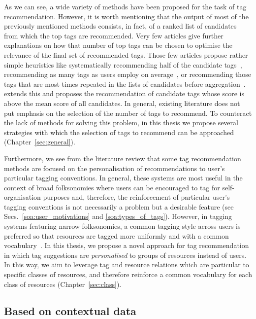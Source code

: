 As we can see, a wide variety of methods have been proposed for the task of tag recommendation.
However, it is worth mentioning that the output of most of the previously mentioned methods consists, in fact, of a ranked list of candidates from which the top tags are recommended. Very few articles give further explanations on how that number of top tags can be chosen to optimise the relevance of the final set of recommended tags. Those few articles propose rather simple heuristics like systematically recommending half of the candidate tags~\citep{Cao2009}, recommending as many tags as users employ on average~\citep{Marinho2009,Rendle2009}, or recommending those tags that are most times repeated in the lists of candidates before aggregation~\citep{martinez2009,moha2012}. \cite{Sood2007} extends this and proposes the recommendation of candidate tags whose score is above the mean score of all candidates. 
In general, existing literature does not put emphasis on the selection of the number of tags to recommend. 
To counteract the lack of methods for solving this problem, in this thesis we propose several strategies with which the selection of tags to recommend can be approached (Chapter~\ref{sec:general}). 

Furthermore, we see from the literature review that some tag recommendation methods are focused on the personalisation of recommendations to user's particular tagging conventions. 
In general, these systems are most useful in the context of broad folksonomies where users can be encouraged to tag for self-organisation purposes and, therefore, the reinforcement of particular user's tagging conventions is not necessarily a problem  but a desirable feature (see Secs.~\ref{soa:user_motivations} and \ref{soa:types_of_tags}).
However, in tagging systems featuring narrow folksonomies, a common tagging style across users is preferred so that resources are tagged more uniformly and with a common vocabulary~\citep{Lipczak2008}. In this thesis, we propose a novel approach for tag recommendation in which tag suggestions are \emph{personalised} to groups of resources instead of users. In this way, we aim to leverage tag and resource relations which are particular to specific classes of resources, and therefore reinforce a common vocabulary for each class of resources (Chapter~\ref{sec:class}).


\subsection{Based on contextual data}

